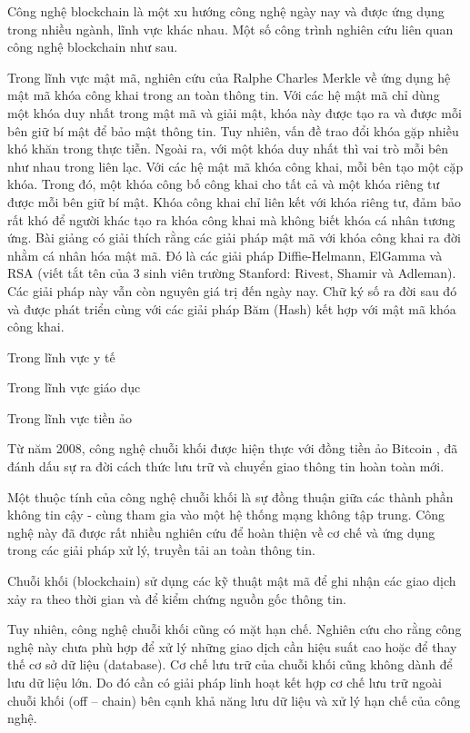 Công nghệ blockchain là một xu hướng công nghệ ngày nay và được ứng dụng trong nhiều ngành, lĩnh vực khác nhau. Một số công trình nghiên cứu liên quan công nghệ blockchain như sau.

Trong lĩnh vực mật mã, nghiên cứu \cite{ralphcharlesmerkle1979} của Ralphe Charles Merkle về ứng dụng hệ mật mã khóa công khai trong an toàn thông tin.
Với các hệ mật mã chỉ dùng một khóa duy nhất trong mật mã và giải mật, khóa này được tạo ra và được mỗi bên giữ bí mật để bảo mật thông tin. 
Tuy nhiên, vấn đề trao đổi khóa gặp nhiều khó khăn trong thực tiễn.
Ngoài ra, với một khóa duy nhất thì vai trò mỗi bên như nhau trong liên lạc.
Với các hệ mật mã khóa công khai, mỗi bên tạo một cặp khóa.
Trong đó, một khóa công bố công khai cho tất cả và một khóa riêng tư được mỗi bên giữ bí mật.
Khóa công khai chỉ liên kết với khóa riêng tư, đảm bảo rất khó để người khác tạo ra khóa công khai mà không biết khóa cá nhân tương ứng.
Bài giảng \cite{lequyetthang2016} có giải thích rằng các giải pháp mật mã với khóa công khai ra đời nhằm cá nhân hóa mật mã.
Đó là các giải pháp Diffie-Helmann, ElGamma và RSA (viết tắt tên của 3 sinh viên trường Stanford: Rivest, Shamir và Adleman).
Các giải pháp này vẫn còn nguyên giá trị đến ngày nay.
Chữ ký số ra đời sau đó và được phát triển cùng với các giải pháp Băm (Hash) kết hợp với mật mã khóa công khai. 


Trong lĩnh vực y tế

Trong lĩnh vực giáo dục

Trong lĩnh vực tiền ảo

Từ năm 2008, công nghệ chuỗi khối được hiện thực với đồng tiền ảo Bitcoin \cite{nakamoto2008bitcoin}, đã đánh dấu sự ra đời cách thức lưu trữ và chuyển giao thông tin hoàn toàn mới.

Một thuộc tính của công nghệ chuỗi khối là sự đồng thuận giữa các thành phần không tin cậy - cùng tham gia vào một hệ thống mạng không tập trung. Công nghệ này đã được rất nhiều nghiên cứu \cite{10.1145/3190508.3190538, ANTWI2021100012, fair2019, 8246573, Fang2020} để hoàn thiện về cơ chế và ứng dụng trong các giải pháp xử lý, truyền tải an toàn thông tin.

Chuỗi khối (blockchain) sử dụng các kỹ thuật mật mã \cite{lequyetthang2016, christofpaar2015, ralphcharlesmerkle1979, shannon-otp} để ghi nhận các giao dịch xảy ra theo thời gian và để kiểm chứng nguồn gốc thông tin.

Tuy nhiên, công nghệ chuỗi khối cũng có mặt hạn chế.
Nghiên cứu \cite{CHEN20191122} cho rằng công nghệ này chưa phù hợp để xử lý những giao dịch cần hiệu suất cao hoặc để thay thế cơ sở dữ liệu (database).
Cơ chế lưu trữ của chuỗi khối cũng không dành để lưu dữ liệu lớn.
Do đó cần có giải pháp linh hoạt kết hợp cơ chế lưu trữ ngoài chuỗi khối (off -- chain) bên cạnh khả năng lưu dữ liệu và xử lý hạn chế của công nghệ.

